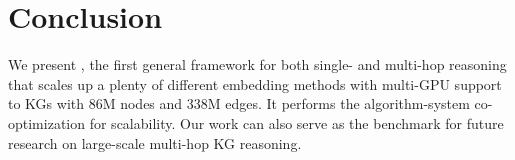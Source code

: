\section{Conclusion}
We present \modelshort, the first general framework for both single- and multi-hop reasoning 
that scales up a plenty of different embedding methods with multi-GPU support to KGs with 86M nodes and 338M edges. It performs the algorithm-system co-optimization for scalability. Our work can also serve as the benchmark for future research on large-scale multi-hop KG reasoning. 